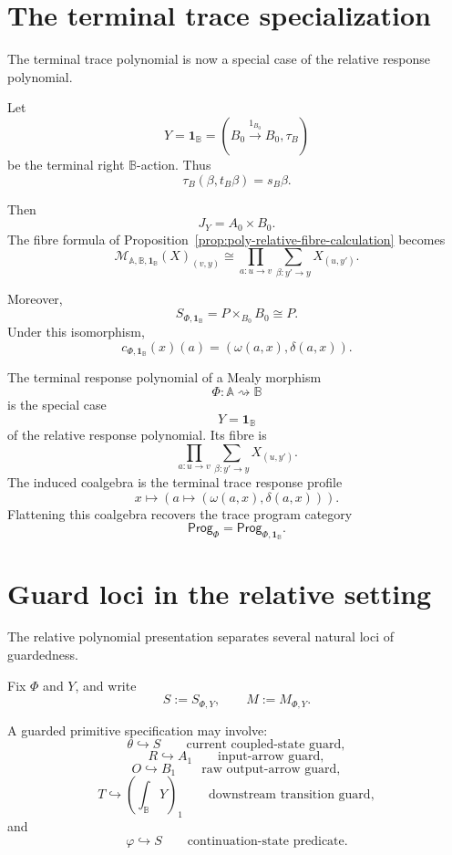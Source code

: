 \section{The terminal trace specialization}
\label{sec:poly-relative-terminal-specialization}

The terminal trace polynomial is now a special case of the relative response
polynomial.

Let
\[
Y=\mathbf 1_{\mathbb B}
=
(B_0\xrightarrow{1_{B_0}}B_0,\tau_B)
\]
be the terminal right \(\mathbb B\)-action.  Thus
\[
\tau_B(\beta,t_B\beta)=s_B\beta.
\]

Then
\[
J_Y=A_0\times B_0.
\]
The fibre formula of Proposition~\ref{prop:poly-relative-fibre-calculation}
becomes
\[
\mathcal M_{\mathbb A,\mathbb B,\mathbf 1_{\mathbb B}}(X)_{(v,y)}
\cong
\prod_{a:u\to v}
\sum_{\beta:y'\to y}
X_{(u,y')}.
\]

Moreover,
\[
S_{\Phi,\mathbf 1_{\mathbb B}}
=
P\times_{B_0}B_0
\cong
P.
\]
Under this isomorphism,
\[
c_{\Phi,\mathbf 1_{\mathbb B}}(x)(a)
=
(\omega(a,x),\delta(a,x)).
\]

\begin{corollary}
\label{cor:poly-relative-terminal-mealy-polynomial}
The terminal response polynomial of a Mealy morphism
\[
\Phi:\mathbb A\rightsquigarrow\mathbb B
\]
is the special case
\[
Y=\mathbf 1_{\mathbb B}
\]
of the relative response polynomial.  Its fibre is
\[
\prod_{a:u\to v}
\sum_{\beta:y'\to y}
X_{(u,y')}.
\]
The induced coalgebra is the terminal trace response profile
\[
x
\longmapsto
\left(
a
\longmapsto
(\omega(a,x),\delta(a,x))
\right).
\]
Flattening this coalgebra recovers the trace program category
\[
\mathsf{Prog}_\Phi
=
\mathsf{Prog}_{\Phi,\mathbf 1_{\mathbb B}}.
\]
\end{corollary}

\section{Guard loci in the relative setting}
\label{sec:poly-relative-guard-loci}

The relative polynomial presentation separates several natural loci of
guardedness.

Fix \(\Phi\) and \(Y\), and write
\[
S:=S_{\Phi,Y},
\qquad
M:=M_{\Phi,Y}.
\]

A guarded primitive specification may involve:
\[
\theta\hookrightarrow S
\qquad
\text{current coupled-state guard},
\]
\[
R\hookrightarrow A_1
\qquad
\text{input-arrow guard},
\]
\[
O\hookrightarrow B_1
\qquad
\text{raw output-arrow guard},
\]
\[
T\hookrightarrow \left(\int_{\mathbb B}Y\right)_1
\qquad
\text{downstream transition guard},
\]
and
\[
\varphi\hookrightarrow S
\qquad
\text{continuation-state predicate}.
\]


